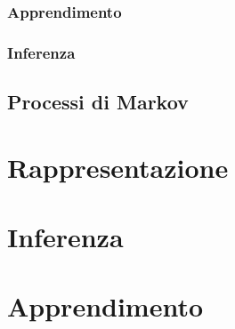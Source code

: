 \begin{definizione}[Indipendenza]
\end{definizione} 

\begin{definizione}
\end{definizione} 

\subsubsection{Apprendimento}

\subsubsection{Inferenza}

\subsection{Processi di Markov}
\label{sec:mps}

\begin{definizione}
\end{definizione} 

\begin{definizione}
\end{definizione} 

\begin{definizione}
\end{definizione} 

\begin{definizione}
\end{definizione} 

\begin{definizione}
\end{definizione} 

\section{Rappresentazione}

\section{Inferenza}

\section{Apprendimento}


